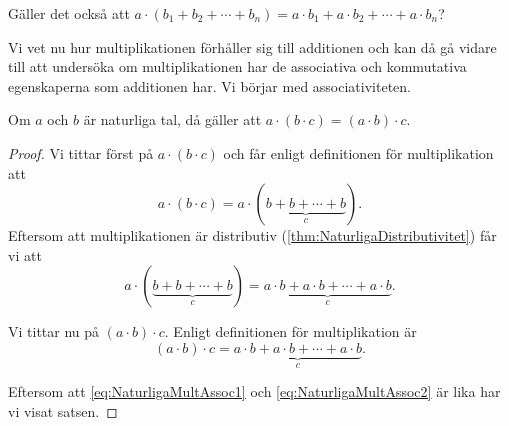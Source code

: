 \begin{exercise}
  Gäller det också att
  \(a\cdot (b_1+b_2+\cdots+b_n) =
    a\cdot b_1 + a\cdot b_2 + \cdots + a\cdot b_n\)?
\end{exercise}

Vi vet nu hur multiplikationen förhåller sig till additionen och kan då gå
vidare till att undersöka om multiplikationen har de associativa och
kommutativa egenskaperna som additionen har.
Vi börjar med associativiteten.
\begin{theorem}[Associativitet]\label{thm:NaturligaMultiplikationAssociativ}
  Om \(a\) och \(b\) är naturliga tal, då gäller att \(a\cdot(b\cdot
  c)=(a\cdot b)\cdot c\).
\end{theorem}
\begin{proof}
  Vi tittar först på \(a\cdot (b\cdot c)\) och får enligt definitionen för
  multiplikation att
  \begin{equation*}
    a\cdot (b\cdot c) = a\cdot (\underbrace{b+b+\cdots+b}_c).
  \end{equation*}
  Eftersom att multiplikationen är distributiv
  (\cref{thm:NaturligaDistributivitet}) får vi att
  \begin{equation}
    \label{eq:NaturligaMultAssoc1}
    a\cdot (\underbrace{b+b+\cdots +b}_c) = \underbrace{a\cdot b+a\cdot
      b+\cdots+a\cdot b}_c.
  \end{equation}

  Vi tittar nu på \((a\cdot b)\cdot c\).
  Enligt definitionen för multiplikation är
  \begin{equation}
    \label{eq:NaturligaMultAssoc2}
    (a\cdot b)\cdot c = \underbrace{a\cdot b+a\cdot b+\cdots+a\cdot b}_c.
  \end{equation}

  Eftersom att \cref{eq:NaturligaMultAssoc1} och
  \cref{eq:NaturligaMultAssoc2} är lika har vi visat satsen.
\end{proof}

